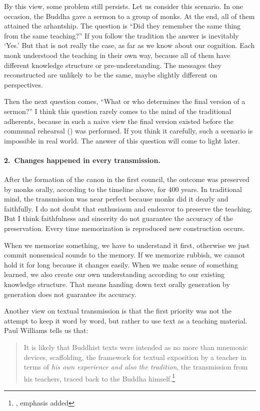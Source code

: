 By this view, some problem still persists. Let us consider this scenario. In one occasion, the Buddha gave a sermon to a group of monks. At the end, all of them attained the arhantship. The question is ``Did they remember the same thing from the same teaching?'' If you follow the tradition the answer is inevitably `Yes.' But that is not really the case, as far as we know about our cognition. Each monk understood the teaching in their own way, because all of them have different knowledge structure or pre-understanding. The messages they reconstructed are unlikely to be the same, maybe slightly different on perspectives. 

Then the next question comes, ``What or who determines the final version of a sermon?'' I think this question rarely comes to the mind of the traditional adherents, because in such a naive view the final version existed before the communal rehearsal () was performed. If you think it carefully, such a scenario is impossible in real world. The answer of this question will come to light later.

\paragraph*{2.\ Changes happened in every transmission.} After the formation of the canon in the first council, the outcome was preserved by monks orally, according to the timeline above, for 400 years. In traditional mind, the transmission was near perfect because monks did it dearly and faithfully. I do not doubt that enthusiasm and endeavor to preserve the teaching. But I think faithfulness and sincerity do not guarantee the accuracy of the preservation. Every time memorization is reproduced new construction occurs.

When we memorize something, we have to understand it first, otherwise we just commit nonsensical sounds to the memory. If we memorize rubbish, we cannot hold it for long because it changes easily. When we make sense of something learned, we also create our own understanding according to our existing knowledge structure. That means handing down text orally generation by generation does not guarantee its accuracy.

Another view on textual transmission is that the first priority was not the attempt to keep it word by word, but rather to use text as a teaching material. Paul Williams tells us that:

\begin{quote}
It is likely that Buddhist texts were intended as no more than mnemonic devices, scaffolding, the framework for textual exposition by a teacher in terms of \emph{his own experience and also the tradition}, the transmission from his teachers, traced back to the Buddha himself.\footnote{\citealp[p.~45]{williams:mahayana}, emphasis added}
\end{quote}

